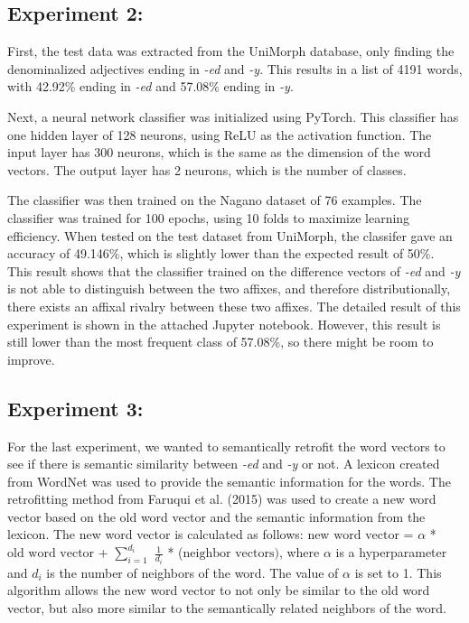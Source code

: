 \documentclass[12pt]{article}
\begin{document}
    \subsection{Experiment 2:}
    First, the test data was extracted from the UniMorph database, only finding the denominalized adjectives ending in \emph{-ed} and \emph{-y}. This results in a list of 4191 words, with 42.92\% ending in \emph{-ed} and 57.08\% ending in \emph{-y}. 

    Next, a neural network classifier was initialized using PyTorch. This classifier has one hidden layer of 128 neurons, using ReLU as the activation function. The input layer has 300 neurons, which is the same as the dimension of the word vectors. The output layer has 2 neurons, which is the number of classes.  
    
    The classifier was then trained on the Nagano dataset of 76 examples. The classifier was trained for 100 epochs, using 10 folds to maximize learning efficiency. When tested on the test dataset from UniMorph, the classifer gave an accuracy of 49.146\%, which is slightly lower than the expected result of 50\%. This result shows that the classifier trained on the difference vectors of \emph{-ed} and \emph{-y} is not able to distinguish between the two affixes, and therefore distributionally, there exists an affixal rivalry between these two affixes. The detailed result of this experiment is shown in the attached Jupyter notebook. However, this result is still lower than the most frequent class of 57.08\%, so there might be room to improve. 

    \subsection{Experiment 3:}
    For the last experiment, we wanted to semantically retrofit the word vectors to see if there is semantic similarity between \emph{-ed} and \emph{-y} or not. A lexicon created from WordNet was used to provide the semantic information for the words. The retrofitting method from Faruqui et al. (2015) was used to create a new word vector based on the old word vector and the semantic information from the lexicon. The new word vector is calculated as follows: $\text{new word vector}$ = $\alpha$ * $\text{old word vector}$ + $\sum_{i=1}^{d_i}$ $\frac{1}{d_i}$ * ($\text{neighbor vectors})$, where $\alpha$ is a hyperparameter and $d_i$ is the number of neighbors of the word. The value of $\alpha$ is set to 1. This algorithm allows the new word vector to not only be similar to the old word vector, but also more similar to the semantically related neighbors of the word.
\end{document}
